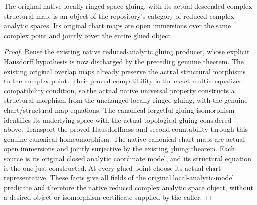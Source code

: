 \begin{theorem}
\label{hir:disjoint-analytic-saturated-glued-space}
\leanok
The original native locally-ringed-space gluing, with its actual descended
complex structural map, is an object of the repository's category of reduced
complex analytic spaces. Its original chart maps are open immersions over the
same complex point and jointly cover the entire glued object.
\end{theorem}
\begin{proof}
Reuse the existing native reduced-analytic gluing producer, whose explicit
Hausdorff hypothesis is now discharged by the preceding genuine theorem.
The existing original overlap maps already preserve the actual structural
morphisms to the complex point. Their proved compatibility is the exact
multicoequalizer compatibility condition, so the actual native universal
property constructs a structural morphism from the unchanged locally ringed
gluing, with the genuine chart/structural-map equations. The canonical
forgetful gluing isomorphism identifies its underlying space with the actual
topological gluing considered above. Transport the proved Hausdorffness and
second countability through this genuine canonical homeomorphism. The native
canonical chart maps are actual open immersions and jointly surjective by
the existing gluing theorem. Each source is its original closed analytic
coordinate model, and its structural equation is the one just constructed.
At every glued point choose its actual chart representative. These facts give
all fields of the original local-analytic-model predicate and therefore the
native reduced complex analytic space object, without a desired-object or
isomorphism certificate supplied by the caller.
\end{proof}
